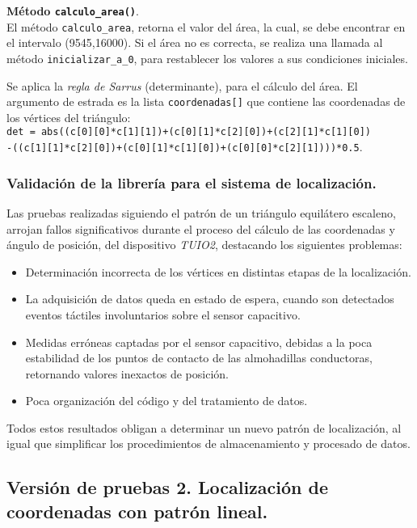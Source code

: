 \textbf{Método \texttt{calculo\_area()}}.\\
El método \texttt{calculo\_area}, retorna el valor del área, la cual, se debe encontrar en el intervalo (9545,16000). 
Si el área no es correcta, se realiza una llamada al método \texttt{inicializar\_a\_0}, para restablecer los valores a sus condiciones iniciales. 

Se aplica la \emph{regla de Sarrus} (determinante), para el cálculo del área. El argumento de estrada es la lista \texttt{coordenadas[]} que contiene las coordenadas de los vértices del triángulo:\\
\texttt{det = abs((c[0][0]*c[1][1])+(c[0][1]*c[2][0])+(c[2][1]*c[1][0])}\\
\texttt{-((c[1][1]*c[2][0])+(c[0][1]*c[1][0])+(c[0][0]*c[2][1])))*0.5}.\\



\subsubsection{Validación de la librería para el sistema de localización.}

Las pruebas realizadas siguiendo el patrón de un triángulo equilátero escaleno, arrojan fallos significativos durante el proceso del cálculo de las coordenadas y ángulo de posición, del dispositivo \emph{TUIO2}, destacando los siguientes problemas:
\begin{itemize}
\item Determinación incorrecta de los vértices en distintas etapas de la localización.
\item La adquisición de datos queda en estado de espera, cuando son detectados eventos táctiles involuntarios sobre el sensor capacitivo.
\item Medidas erróneas captadas por el sensor capacitivo, debidas a la poca estabilidad de los puntos de contacto de las almohadillas conductoras, retornando valores inexactos de posición.
\item Poca organización del código y del tratamiento de datos.
\end{itemize}

Todos estos resultados obligan a determinar un nuevo patrón de localización, al igual que simplificar los procedimientos de almacenamiento y procesado de datos.
 
\subsection{Versión de pruebas 2. Localización de coordenadas con patrón lineal.}

